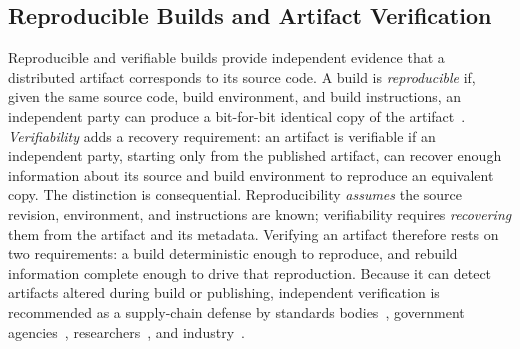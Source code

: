 \subsection{Reproducible Builds and Artifact Verification}
\label{subsec:bg-repro-builds}
Reproducible and verifiable builds provide independent evidence that a distributed artifact corresponds to its source code. A build is \emph{reproducible} if, given
the same source code, build environment, and build instructions, an independent party can produce a bit-for-bit identical copy of the artifact~\cite{lamb_reproducible_2022, ReproducibleBuildsOrg}.
\emph{Verifiability} adds a recovery requirement: an artifact is verifiable if an independent party, starting only from the published artifact, can recover enough
information about its source and build environment to reproduce an equivalent copy.
The distinction is consequential. Reproducibility \emph{assumes} the source revision, environment, and instructions are known; verifiability requires \emph{recovering} them from the artifact and its metadata. Verifying an artifact therefore rests on two requirements: a build deterministic enough to reproduce, and rebuild information complete enough to drive that reproduction. Because it can detect artifacts altered during build or
publishing, independent verification is recommended as a supply-chain defense by standards bodies~\cite{noauthor_securing_nodate}, government agencies~\cite{CISANSAODNI2022}, researchers~\cite{lamb_reproducible_2022},
and industry~\cite{ReproducibleBuildsOrg}.

